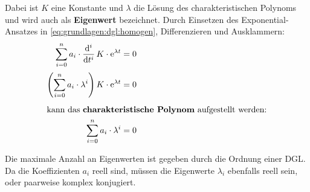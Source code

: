\begin{frame}
{    %

    Dabei ist $K$ eine Konstante und $\lambda$ die Lösung des charakteristischen Polynoms und wird
    auch als \textbf{Eigenwert} bezeichnet. 
    Durch Einsetzen des Exponential-Ansatzes in \ref{eq:grundlagen:dgl:homogen}, Differenzieren und Ausklammern:
    \begin{align}
        \sum_{i=0}^{n} a_i \cdot \dt[i]\, K \cdot \mathrm{e}^{\lambda t} &= 0 \nonumber\\[2pt]
        \left(\sum_{i=0}^{n} a_i \cdot \lambda^i \right) K \cdot \mathrm{e}^{\lambda t} &= 0 \nonumber\\[4pt]
    \intertext{kann das \textbf{charakteristische Polynom}\index{Differentialgleichung>Charakteristische Polynom} aufgestellt werden:}
        \sum_{i=0}^{n} a_i \cdot \lambda^i &= 0
    \end{align}

    Die maximale Anzahl an Eigenwerten ist gegeben durch die Ordnung einer DGL. 
    Da die Koeffizienten $a_i$ reell sind, müssen die Eigenwerte $\lambda_i$ ebenfalls reell sein, oder paarweise komplex konjugiert.

}
\end{frame}

